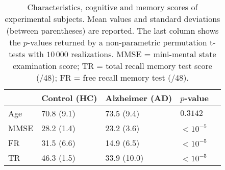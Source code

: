 
\newpage
\begin{table}[!ht]
\footnotesize
	\centering
	\begin{tabular}{lllll}
		\hline
		     & Control (HC) & Alzheimer (AD) & $p$-value  \\ \hline
		Age  & 70.8 (9.1)   & 73.5 (9.4)     & $0.3142$   \\
		MMSE & 28.2 (1.4)   & 23.2 (3.6)     & $<10^{-5}$ \\
		FR   & 31.5 (6.6)   & 14.9 (6.5)     & $<10^{-5}$ \\
		TR   & 46.3 (1.5)   & 33.9 (10.0)    & $<10^{-5}$ \\
	\end{tabular}
	\caption{Characteristics, cognitive and memory scores of experimental subjects. Mean values and standard deviations (between parentheses) are reported. The last column shows the $p$-values returned by a non-parametric permutation t-tests with $10\,000$ realizations. MMSE = mini-mental state examination score; TR = total recall memory test score (/48); FR = free recall memory test (/48).}
	\label{tab:clinical_data}
\end{table}


